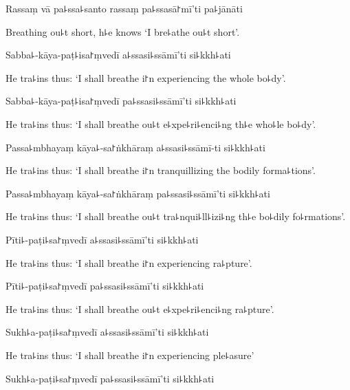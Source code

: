 Rassaṃ vā pa꜕ssa꜕santo rassaṃ pa꜕ssasā꜓mī'ti pa꜕jānāti

\begin{english}
  Breathing ou꜕t short, h꜕e knows `I bre꜕athe ou꜕t short'.
\end{english}

Sabba꜕-kāya-paṭ꜕isa꜓ṃvedī a꜕ssasi꜕ssāmī'ti si꜕kkh꜕ati

\begin{english}
  He tra꜕ins thus: `I shall breathe i꜓n experiencing the whole bo꜕dy'.
\end{english}

Sabba꜕-kāya-paṭ꜕isa꜓ṃvedī pa꜕ssasi꜕ssāmī'ti si꜕kkh꜕ati

\begin{english}
  He tra꜕ins thus: `I shall breathe ou꜕t e꜕xpe꜕ri꜕enci꜕ng th꜕e who꜕le bo꜕dy'.
\end{english}

Passa꜕mbhayaṃ kāya꜕-sa꜓ṅkhāraṃ a꜕ssasi꜕ssāmī-ti si꜕kkh꜕ati

\begin{english}
  He tra꜕ins thus: `I shall breathe i꜓n tranquillizing the bodily forma꜕tions'.
\end{english}

Passa꜕mbhayaṃ kāya꜕-sa꜓ṅkhāraṃ pa꜕ssasi꜕ssāmī'ti si꜕kkh꜕ati

\begin{english}
  He tra꜕ins thus: `I shall breathe ou꜕t tra꜕nqui꜕ll꜕izi꜕ng th꜕e bo꜕dily fo꜕rmations'.
\end{english}

Pīti꜕-paṭi꜕sa꜓ṃvedī a꜕ssasi꜕ssāmī'ti si꜕kkh꜕ati

\begin{english}
  He tra꜕ins thus: `I shall breathe i꜓n experiencing ra꜕pture'.
\end{english}

Pīti꜕-paṭi꜕sa꜓ṃvedī pa꜕ssasi꜕ssāmī'ti si꜕kkh꜕ati

\begin{english}
  He tra꜕ins thus: `I shall breathe ou꜕t e꜕xpe꜕ri꜕enci꜕ng ra꜕pture'.
\end{english}

Sukh꜕a-paṭi꜕sa꜓ṃvedī a꜕ssasi꜕ssāmī'ti si꜕kkh꜕ati

\begin{english}
  He tra꜕ins thus: `I shall breathe i꜓n experiencing ple꜕asure'
\end{english}

Sukh꜕a-paṭi꜕sa꜓ṃvedī pa꜕ssasi꜕ssāmī'ti si꜕kkh꜕ati


